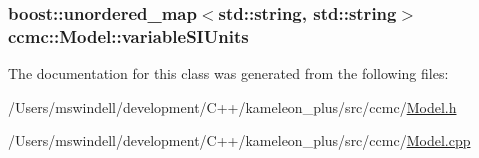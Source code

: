 \hypertarget{classccmc_1_1_model_af782a4c86004df7b9388562551ae87ad}{
\subsubsection[{variable\-S\-I\-Units}]{\setlength{\rightskip}{0pt plus 5cm}boost\-::unordered\-\_\-map$<$std\-::string, std\-::string$>$ ccmc\-::\-Model\-::variable\-S\-I\-Units\hspace{0.3cm}{\ttfamily [protected]}}}\label{classccmc_1_1_model_af782a4c86004df7b9388562551ae87ad}


The documentation for this class was generated from the following files\-:\begin{DoxyCompactItemize}
\item 
/\-Users/mswindell/development/\-C++/kameleon\-\_\-plus/src/ccmc/\hyperlink{_model_8h}{Model.\-h}\item 
/\-Users/mswindell/development/\-C++/kameleon\-\_\-plus/src/ccmc/\hyperlink{_model_8cpp}{Model.\-cpp}\end{DoxyCompactItemize}
